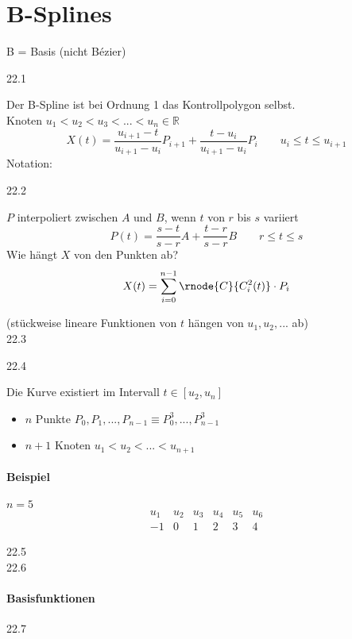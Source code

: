 \section{B-Splines}
B = Basis (nicht Bézier)
\begin{center}
 22.1
\end{center}
Der B-Spline ist bei Ordnung 1 das Kontrollpolygon selbst.\\[1em]
Knoten $u_1 < u_2 < u_3 < ... < u_n \in \mathbb{R}$
\[
 X(t) = \frac{u_{i+1}-t}{u_{i+1}-u_i} P_{i+1} + \frac{t-u_i}{u_{i+1}-u_i} P_i \qquad u_i \le t \le u_{i+1}
\]
Notation:
\begin{center}
 22.2
\end{center}
$P$ interpoliert zwischen $A$ und $B$, wenn $t$ von $r$ bis $s$ variiert
\[P(t) = \frac{s-t}{s-r} A + \frac{t-r}{s-r} B \qquad r \le t \le s\]
Wie hängt $X$ von den Punkten ab?
\[X(t) = \sum\limits_{i=0}^{n-1} \rnode{C}{C^2_i(t)} \cdot P_i\]
\begin{center}
  (stückweise lineare Funktionen von $t$ hängen von
	$u_1, u_2, ...$ ab) \\[1em]
 22.3
\end{center}
\begin{center}
 22.4
\end{center}
Die Kurve existiert im Intervall $t \in [u_2, u_n]$
\begin{itemize}
 \item $n$ Punkte $P_0, P_1, ..., P_{n-1} \equiv P_0^3, ..., P_{n-1}^3$
 \item $n + 1$ Knoten $u_1 < u_2 < ... < u_{n+1}$
\end{itemize}
\paragraph*{Beispiel} $n = 5$
 \[
	\begin{array}{cccccc}
	 u_1 & u_2 & u_3 & u_4 & u_5 & u_6 \\
	 -1  & 0   & 1   & 2   & 3   & 4
	\end{array}
 \]
\begin{center}
 22.5\\[1em]
 22.6
\end{center}

\paragraph*{Basisfunktionen}
\begin{center}
 22.7
\end{center}

